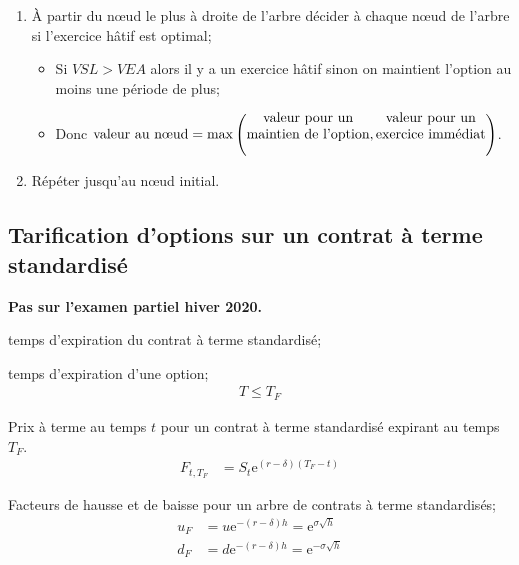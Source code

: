 \documentclass[10pt, french]{article}
\begin{document}
\begin{multicols*}{2}
\begin{algo2}
\begin{enumerate}[leftmargin = *]
	\item	À partir du nœud le plus à droite de l'arbre décider à chaque nœud de l'arbre si l'exercice hâtif est optimal;
		\begin{itemize}[leftmargin = *]
		\item	Si $VSL > VEA$ alors il y a un exercice hâtif sinon on maintient l'option au moins une période de plus;
		\item	Donc $\text{valeur au nœud} = \max\left(\text{\shortstack{valeur pour un\\ maintien de l'option}}, \text{\shortstack{valeur pour un\\ exercice immédiat}}\right)$.
		\end{itemize}
	\item	Répéter jusqu'au nœud initial.
\end{enumerate}
\end{algo2}

\subsection{Tarification d'options sur un contrat à terme standardisé}
\textbf{Pas sur l'examen partiel hiver 2020.}

\begin{distributions}[Notation]
\begin{description}[leftmargin = *]
	\item[$T_{F}$]	temps d'expiration du contrat à terme standardisé;
	\item[$T$]	temps d'expiration d'une option;
		\begin{align*}
		T \le T_{F}
		\end{align*}
	\item[$F_{t, T_{F}}$]	Prix à terme au temps $t$ pour un contrat à terme standardisé expirant au temps $T_{F}$.
		\begin{align*}
		F_{t, T_{F}}
		&=	S_{t} \textrm{e}^{(r - \delta)(T_{F} - t)}
		\end{align*}
	\item[$u_{F}$ et $d_{F}$]	Facteurs de hausse et de baisse pour un arbre de contrats à terme standardisés;
		\begin{align*}
		u_{F}	
		&=	u \textrm{e}^{-(r - \delta)h}	=	\textrm{e}^{\sigma \sqrt{h}}	\\
		d_{F}
		&=	d \textrm{e}^{-(r - \delta)h}	=	\textrm{e}^{-\sigma \sqrt{h}}
		\end{align*}
\end{description}
\end{distributions}


\end{multicols*}
\end{document}
